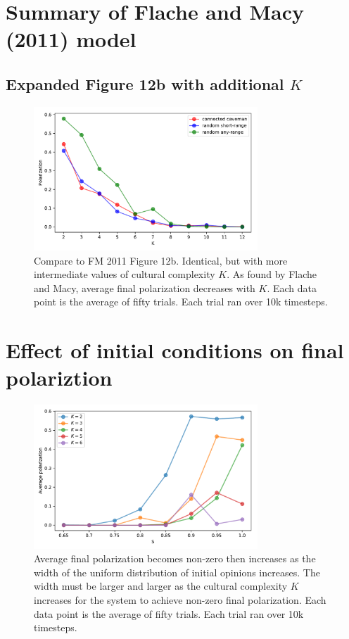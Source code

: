 \documentclass[11pt,letterpaper]{article}
\begin{document}
\section{Summary of Flache and Macy (2011) model}

\subsection{Expanded Figure 12b with additional $K$}
\begin{figure}
  \centering
      \includegraphics[width=0.75\textwidth]{Figures/finegrained_p_vs_K.pdf}
  \caption{
    Compare to FM 2011 Figure 12b. Identical, but with more intermediate
    values of cultural complexity $K$. As found by Flache and Macy, 
    average final polarization decreases with $K$. Each
    data point is the average of fifty trials. Each trial ran over 
    10k timesteps.
  }
  \label{fig:}
\end{figure}


\section{Effect of initial conditions on final polariztion}

\begin{figure}
  \centering
  \includegraphics[width=0.75\textwidth]{Figures/P_vs_S_for_K.pdf}
  \caption{
    Average final polarization becomes non-zero then increases as
    the width of the uniform distribution of initial opinions increases.
    The width must be larger and larger as the cultural complexity $K$ 
    increases for the system to achieve non-zero final polarization. Each
    data point is the average of fifty trials. Each trial ran over 
    10k timesteps.
  }
  \label{fig:p_vs_s_for_k}
\end{figure}
\end{document}

